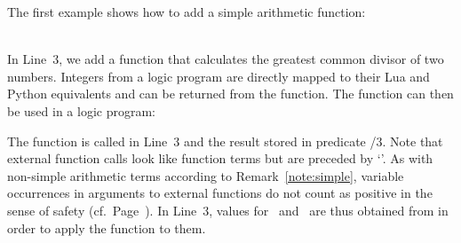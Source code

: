 \begin{example}\label{ex:gcd}
The first example shows how to add a simple arithmetic function:
\\[-8pt] %
\begin{minipage}[t]{0.5\textwidth}

\end{minipage}
\begin{minipage}[t]{0.5\textwidth}

\end{minipage}\\
In Line~3, we add a function that calculates the greatest common divisor of two numbers.
Integers from a logic program are directly mapped to their Lua and Python equivalents
and can be returned from the function.
The  function can then be used in a logic program:%
%

%
The function is called in Line~3 and the result stored in predicate /$3$.
Note that external function calls look like function terms but are preceded by `'.
As with non-simple arithmetic terms
according to Remark~\ref{note:simple},
variable occurrences in arguments to external functions
do not count as positive in the sense of safety (cf.\ Page~\pageref{pg:safe}).
In Line~3, values for~ and~
are thus obtained from 
in order to apply the  function to them.
\end{example}

